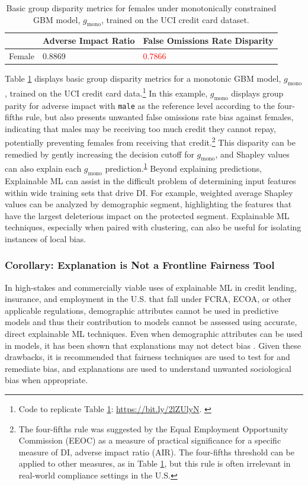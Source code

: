 \documentclass{article}
\begin{document}
\begin{table}
  	\caption{Basic group disparity metrics for females under monotonically constrained GBM model, $g_{\text{mono}}$, trained on the UCI credit card dataset.\\}
  	\label{tab:dia}
  	\centering
  	\begin{tabular}{lll}
    	\toprule
    	& Adverse Impact Ratio & False Omissions Rate Disparity \\
    	\midrule
		Female & 0.8869 & \textcolor{red}{0.7866} \\
    	\bottomrule
  \end{tabular}
\end{table}

Table \ref{tab:dia} displays basic group disparity metrics for a monotonic GBM model, $g_{\text{mono}}$, trained on the UCI credit card data.\footnote{\scriptsize{Code to replicate Table \ref{tab:dia}:  \url{https://bit.ly/2lZUlyN}.} \label{fn:dia}} In this example, $g_{\text{mono}}$ displays group parity for adverse impact with \texttt{male} as the reference level according to the four-fifths rule, but also presents unwanted false omissions rate bias against females, indicating that males may be receiving too much credit they cannot repay, potentially preventing females from receiving that credit.\footnote{\scriptsize{The four-fifths rule was suggested by the Equal Employment Opportunity Commission (EEOC) as a measure of practical significance for a specific measure of DI, adverse impact ratio (AIR). The four-fifths threshold can be applied to other measures, as in Table \ref{tab:dia}, but this rule is often irrelevant in real-world compliance settings in the U.S.}} This disparity can be remedied by gently increasing the decision cutoff for $g_{\text{mono}}$, and Shapley values can also explain each $g_{\text{mono}}$ prediction.\textsuperscript{\ref{fn:dia}} Beyond explaining predictions, Explainable ML can assist in the difficult problem of determining input features within wide training sets that drive DI. For example, weighted average Shapley values can be analyzed by demographic segment, highlighting the features that have the largest deleterious impact on the protected segment. Explainable ML techniques, especially when paired with clustering, can also be useful for isolating instances of local bias. 

\subsubsection{Corollary: Explanation is Not a Frontline Fairness Tool} In high-stakes and commercially viable uses of explainable ML in credit lending, insurance, and employment in the U.S. that fall under FCRA, ECOA, or other applicable regulations, demographic attributes cannot be used in predictive models and thus their contribution to models cannot be assessed using accurate, direct explainable ML techniques. Even when demographic attributes can be used in models, it has been shown that explanations may not detect bias \cite{fair_washing}. Given these drawbacks, it is recommended that fairness techniques are used to test for and remediate bias, and explanations are used to understand unwanted sociological bias when appropriate.  
\end{document}
